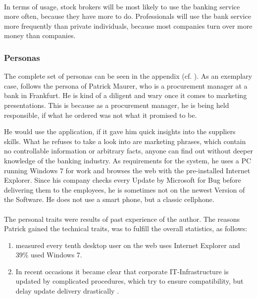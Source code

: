 \paragraph{} In terms of usage, stock brokers will be most likely to use the banking service more often, because they have more to do. Professionals will use the bank service more frequently than private individuals, because most companies turn over more money than companies. 

\subsubsection{Personas}
The complete set of personas can be seen in the appendix (cf. \cpagerefrange{}{}). As an exemplary case, follows the persona of Patrick Maurer, who is a procurement manager at a bank in Frankfurt. He is kind of a diligent and wary once it comes to marketing presentations. This is because as a procurement manager, he is being held responsible, if what he ordered was not what it promised to be. 


He would use the application, if it gave him quick insights into the suppliers skills. What he refuses to take a look into are marketing phrases, which contain no controllable information or arbitrary facts, anyone can find out without deeper knowledge of the banking industry. As requirements for the system, he uses a PC running Windows 7 for work and browses the web with the pre-installed Internet Explorer. Since his company checks every Update by Microsoft for Bug before delivering them to the employees, he is sometimes not on the newest Version of the Software. He does not use a smart phone, but a classic cellphone.

\paragraph{}
The personal traits were results of past experience of the author. The reasons Patrick gained the technical traits, was to fulfill the overall statistics, as follows:
\begin{enumerate}
    \item \textcite{StatCounter.2017} measured every tenth desktop user on the web uses Internet Explorer and 39\% used Windows 7. 
    \item In recent occasions it became clear that corporate IT-Infrastructure is updated by complicated procedures, which try to ensure compatibility, but delay update delivery drastically \parencites{Gierow.2017}{Zivadinovic.13.05.2017}.
\end{enumerate}

